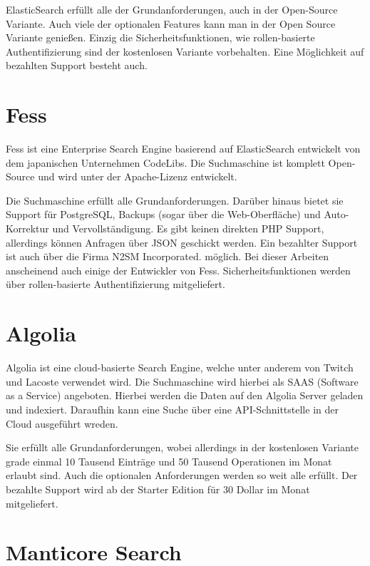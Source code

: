 ElasticSearch erfüllt alle der Grundanforderungen, auch in der Open-Source Variante. Auch viele der optionalen Features kann man in der Open Source Variante genießen. Einzig die Sicherheitsfunktionen, wie rollen-basierte Authentifizierung sind der kostenlosen Variante vorbehalten. Eine Möglichkeit auf bezahlten Support besteht auch. \cite{Elasticsearch.2019}

\section{Fess}
\label{fess}

Fess ist eine Enterprise Search Engine basierend auf ElasticSearch entwickelt von dem japanischen Unternehmen CodeLibs. Die Suchmaschine ist komplett Open-Source und wird unter der Apache-Lizenz entwickelt.

Die Suchmaschine erfüllt alle Grundanforderungen. Darüber hinaus bietet sie Support für PostgreSQL, Backups (sogar über die Web-Oberfläche) und Auto-Korrektur und Vervollständigung. Es gibt keinen direkten PHP Support, allerdings können Anfragen über JSON geschickt werden. Ein bezahlter Support ist auch über die Firma N2SM Incorporated. \cite{N2SM.2019} möglich. Bei dieser Arbeiten anscheinend auch einige der Entwickler von Fess. Sicherheitsfunktionen werden über rollen-basierte Authentifizierung mitgeliefert. \cite{CodeLibs.2019}

\section{Algolia}
\label{algolia}

Algolia ist eine cloud-basierte Search Engine, welche unter anderem von Twitch und Lacoste verwendet wird. Die Suchmaschine wird hierbei als SAAS (Software as a Service) angeboten. Hierbei werden die Daten auf den Algolia Server geladen und indexiert. Daraufhin kann eine Suche über eine API-Schnittstelle in der Cloud ausgeführt wreden.

Sie erfüllt alle Grundanforderungen, wobei allerdings in der kostenlosen Variante grade einmal 10 Tausend Einträge und 50 Tausend Operationen im Monat erlaubt sind. Auch die optionalen Anforderungen werden so weit alle erfüllt. Der bezahlte Support wird ab der Starter Edition für 30 Dollar im Monat mitgeliefert. \cite{Algolia.2019}

\section{Manticore Search}
\label{manticore}

